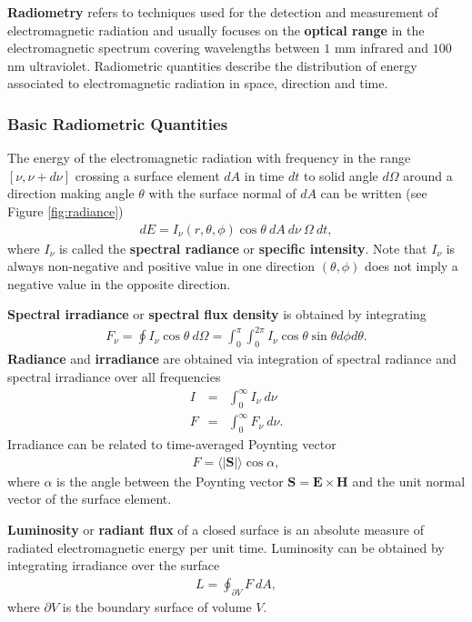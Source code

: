 \documentclass [12pt, a4paper] {article}
\newcommand{\vc}[1]
{
	\boldsymbol{#1}
}
\begin{document}
\textbf{Radiometry} refers to techniques used for the detection and measurement
of electromagnetic radiation and usually focuses on the \textbf{optical range} 
in the electromagnetic spectrum covering wavelengths between $1$ mm infrared 
and $100$ nm ultraviolet. Radiometric quantities describe the distribution of 
energy associated to electromagnetic radiation in space, direction and time.
\subsubsection{Basic Radiometric Quantities}
The energy of the electromagnetic radiation with frequency in the range 
$[\nu, \nu + d\nu]$ crossing a surface element $dA$ in time $dt$ to solid 
angle $d\Omega$ around a direction making angle $\theta$ with the surface normal 
of $dA$ can be written (see Figure \ref{fig:radiance})
\begin {eqnarray}
    dE = I_\nu(r, \theta, \phi)\cos\theta\:dA\:d\nu\:\Omega\:dt,
\end {eqnarray}
where $I_\nu$ is called the \textbf{spectral radiance} or \textbf{specific intensity}.
Note that $I_\nu$ is always non-negative and positive value in one direction 
$(\theta, \phi)$ does not imply a negative value in the opposite direction.

\textbf{Spectral irradiance} or \textbf{spectral flux density} is obtained 
by integrating 
\begin {eqnarray}
    F_{\nu} 
    =
    \oint I_\nu\cos\theta\:d\Omega 
    =
    \int_0^\pi\int_0^{2\pi}I_\nu\cos\theta\sin\theta d\phi d\theta.
\end {eqnarray}
\textbf{Radiance} and \textbf{irradiance} are obtained via integration of 
spectral radiance and spectral irradiance over all frequencies 
\begin {eqnarray}
    I &=& \int_0^\infty I_\nu\:d\nu \\
    F &=& \int_0^\infty F_\nu\:d\nu.
\end {eqnarray}
Irradiance can be related to time-averaged Poynting vector 
\begin {eqnarray}
    F = \langle|\vc S|\rangle \cos\alpha,
\end {eqnarray}
where $\alpha$ is the angle between the Poynting vector $\vc S = \vc E\times\vc H$ 
and the unit normal vector of the surface element.

\textbf{Luminosity} or \textbf{radiant flux} of a closed surface is an absolute 
measure of radiated electromagnetic energy per unit time. Luminosity can be 
obtained by integrating irradiance over the surface 
\begin {eqnarray}
    L = \oint_{\partial V} F\:dA,
\end {eqnarray}
where $\partial V$ is the boundary surface of volume $V$.
\end{document}
